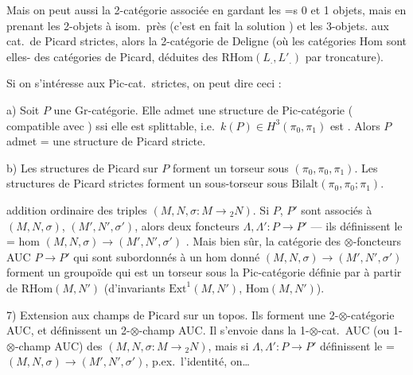 \documentclass[11pt,a4paper]{article}
\begin{document}
Mais on peut aussi  la 2-catégorie associée en gardant
les =s 0 et 1 objets, mais en prenant les 2-objets à isom.\ près (c'est en
fait la solution \ill{}) et  les 3-objets.
 aux cat.\ de Picard strictes,
 alors la 2-catégorie de Deligne (où les
catégories Hom sont elles- des catégories de Picard,
déduites des $\mathrm{RHom}(L_{.}, L'_{.})$ par troncature).

Si on s'intéresse  aux Pic-cat.\ strictes, on peut dire
ceci :

a) Soit $P$ une Gr-catégorie. Elle admet une structure de Pic-catégorie
( compatible avec \ill{}) ssi elle est
splittable, i.e.\ $k(P) \in H^3(\pi_0, \pi_1)$ est . Alors
$P$ admet = une structure de Picard stricte.

b) Les structures de Picard  sur $P$ forment un torseur
sous $(\pi_0, \pi_0, \pi_1)$. Les structures
de Picard strictes forment un sous-torseur sous $\mathrm{Bilalt}(\pi_0,
\pi_0 ; \pi_1)$.

\struck{\ill} addition ordinaire 
des triples $(M, N, \sigma : M \to {}_2N)$. Si $P$, $P'$ sont associés à
$(M,N,\sigma)$, $(M',N',\sigma')$, alors deux foncteurs $\Lambda, \Lambda'
: P \to P'$  — ils définissent le = hom
$(M,N,\sigma) \to (M',N',\sigma')$ . Mais bien sûr, la
catégorie des $\otimes$-foncteurs AUC $P \to P'$ qui sont subordonnés à un
hom donné $(M,N,\sigma) \to (M',N',\sigma')$ forment un groupoïde qui est
un torseur sous la Pic-catégorie définie par  à
partir de $\mathrm{RHom}(M,N')$ (d'invariants $\mathrm{Ext}^1(M,N')$,
$\mathrm{Hom}(M,N')$).


7)  Extension aux champs de Picard sur un topos. Ils
forment une 2-$\otimes$-catégorie AUC, et définissent un 2-$\otimes$-champ
AUC. Il s'envoie dans la 1-$\otimes$-cat.\ AUC (ou 1-$\otimes$-champ AUC)
des $(M, N, \sigma : M \to {}_2N)$, mais si $\Lambda, \Lambda' : P \to P'$
définissent le = $(M,N,\sigma) \to (M',N',\sigma')$, p.ex.\ l'identité,
on\ldots
\end{document}
